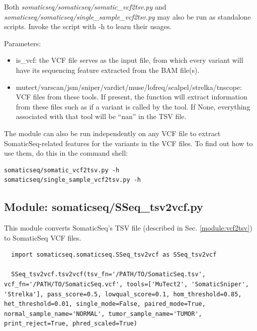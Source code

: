 \documentclass[10pt,letterpaper]{article}
\begin{document}
\begin{sloppypar}
Both \textit{somaticseq/somaticseq/somatic\_vcf2tsv.py} and \textit{somaticseq/somaticseq/single\_sample\_vcf2tsv.py} may also be run as standalone scripts. Invoke the script with -h to learn their usages. 


Parameters:

\begin{itemize}

\item is\_vcf: the VCF file serves as the input file, from which every variant will have its sequencing feature extracted from the BAM file(s). 

\item mutect/varscan/jsm/sniper/vardict/muse/lofreq/scalpel/strelka/tnscope: VCF files from these tools. If present, the function will extract information from these files such as if a variant is called by the tool. If None, everything associated with that tool will be ``nan'' in the TSV file.

\end{itemize}


The module can also be run independently on any VCF file to extract SomaticSeq-related features for the variants in the VCF files. To find out how to use them, do this in the command shell: 

\begin{lstlisting}
somaticseq/somatic_vcf2tsv.py -h
somaticseq/single_sample_vcf2tsv.py -h
\end{lstlisting}







\subsection{Module: somaticseq/SSeq\_tsv2vcf.py} \label{module:tsv2vcf}

This module converts SomaticSeq's TSV file (described in Sec. \ref{module:vcf2tsv}) to SomaticSeq VCF files.


\begin{lstlisting}
  import somaticseq.somaticseq.SSeq_tsv2vcf as SSeq_tsv2vcf
  
  SSeq_tsv2vcf.tsv2vcf(tsv_fn='/PATH/TO/SomaticSeq.tsv', vcf_fn='/PATH/TO/SomaticSeq.vcf', tools=['MuTect2', 'SomaticSniper', 'Strelka'], pass_score=0.5, lowqual_score=0.1, hom_threshold=0.85, het_threshold=0.01, single_mode=False, paired_mode=True, normal_sample_name='NORMAL', tumor_sample_name='TUMOR', print_reject=True, phred_scaled=True)
\end{lstlisting}


\end{sloppypar}
\end{document}
